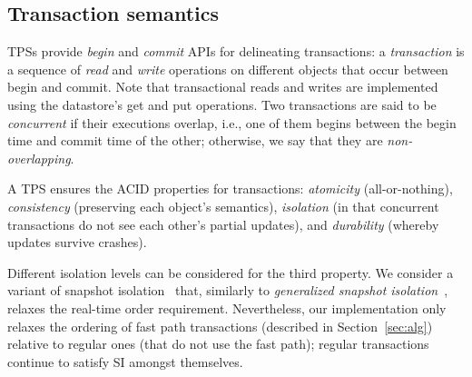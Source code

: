\subsection{Transaction semantics} \label{ssec:transactions}

TPSs provide \emph{begin} and \emph{commit} APIs for delineating transactions: 
a \emph{transaction} is a sequence of \emph{read} and \emph{write} operations on different objects 
that occur between begin and commit. Note that transactional reads and writes are implemented using the 
datastore's get and put operations.
Two transactions are said to be \emph{concurrent} if 
their executions overlap, i.e., one of them begins between the begin time and commit time of the other;
otherwise, we say that they are \emph{non-overlapping}.

A TPS  ensures the ACID properties for transactions:
\emph{atomicity} (all-or-nothing), \emph{consistency} (preserving each object's semantics), 
\emph{isolation} (in that concurrent transactions do not see each other's partial updates), and 
\emph{durability} (whereby updates survive crashes).

Different isolation levels can be considered for the third property. We consider a variant of 
snapshot isolation~\cite{DBLP:conf/sigmod/BerensonBGMOO95} that, similarly to \emph{generalized snapshot isolation}~\cite{DBLP:conf/srds/ElniketyZP05}, relaxes  the real-time order requirement. 
Nevertheless, our implementation only relaxes the ordering of fast path  transactions (described in Section~\ref{sec:alg}) 
relative to regular ones (that do not use the fast path); regular transactions continue to satisfy SI amongst themselves. 

